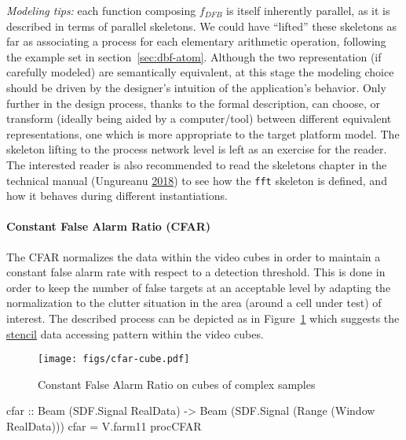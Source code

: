 \documentclass[
  a4paper,
]{article}
\newenvironment{Shaded}{}{}
\newcommand{\DataTypeTok}[1]{\textcolor[rgb]{0.56,0.13,0.00}{#1}}
\newcommand{\FunctionTok}[1]{\textcolor[rgb]{0.02,0.16,0.49}{#1}}
\newcommand{\NormalTok}[1]{#1}
\newcommand{\OtherTok}[1]{\textcolor[rgb]{0.00,0.44,0.13}{#1}}
\let\oldparagraph\paragraph
\renewcommand{\paragraph}[1]{\oldparagraph{#1}\mbox{}}
\begin{document}
\emph{Modeling tips:} each function composing \(f_{DFB}\) is itself
inherently parallel, as it is described in terms of parallel skeletons.
We could have ``lifted'' these skeletons as far as associating a process
for each elementary arithmetic operation, following the example set in
section~\ref{sec:dbf-atom}. Although the two representation (if
carefully modeled) are semantically equivalent, at this stage the
modeling choice should be driven by the designer's intuition of the
application's behavior. Only further in the design process, thanks to
the formal description, can choose, or transform (ideally being aided by
a computer/tool) between different equivalent representations, one which
is more appropriate to the target platform model. The skeleton lifting
to the process network level is left as an exercise for the reader. The
interested reader is also recommended to read the skeletons chapter in
the technical manual (Ungureanu
\protect\hyperlink{ref-atom-manual}{2018}) to see how the \texttt{fft}
skeleton is defined, and how it behaves during different instantiations.

\hypertarget{constant-false-alarm-ratio-cfar}{%
\paragraph{Constant False Alarm Ratio
(CFAR)}\label{constant-false-alarm-ratio-cfar}}

The CFAR normalizes the data within the video cubes in order to maintain
a constant false alarm rate with respect to a detection threshold. This
is done in order to keep the number of false targets at an acceptable
level by adapting the normalization to the clutter situation in the area
(around a cell under test) of interest. The described process can be
depicted as in Figure~\ref{fig:cfar-cube} which suggests the
\href{https://en.wikipedia.org/wiki/Stencil_code}{stencil} data
accessing pattern within the video cubes.

\begin{figure}
\hypertarget{fig:cfar-cube}{%
\centering
\texttt{[image: figs/cfar-cube.pdf]}
\caption{Constant False Alarm Ratio on cubes of complex
samples}\label{fig:cfar-cube}
}
\end{figure}

\begin{Shaded}
\begin{Highlighting}[numbers=left,,firstnumber=390,]
\OtherTok{cfar ::} \DataTypeTok{Beam}\NormalTok{ (}\DataTypeTok{SDF.Signal} \DataTypeTok{RealData}\NormalTok{)}
     \OtherTok{->} \DataTypeTok{Beam}\NormalTok{ (}\DataTypeTok{SDF.Signal}\NormalTok{ (}\DataTypeTok{Range}\NormalTok{ (}\DataTypeTok{Window} \DataTypeTok{RealData}\NormalTok{)))}
\NormalTok{cfar }\FunctionTok{=}\NormalTok{ V.farm11 procCFAR}
\end{Highlighting}
\end{Shaded}
\end{document}
